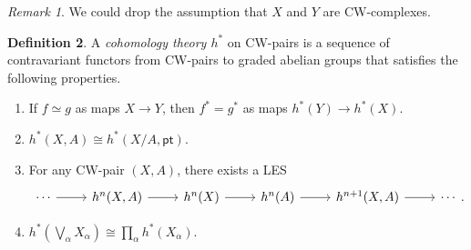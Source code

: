 \documentclass[10pt,letterpaper,cm]{nupset}
\theoremstyle{definition}
\newtheorem{definition}{Definition}[subsection]
\theoremstyle{theorem}
\theoremstyle{remark}
\newtheorem{remark}[definition]{Remark}
\newcommand{\1}{\mathbb{1}}
\newcommand{\0}{\vec 0}
\newcommand{\pt}{\mathsf{pt}}
\begin{document}
\begin{remark}
We could drop the assumption that $X$ and $Y$ are CW-complexes.
\end{remark}

\begin{definition}
A \textit{cohomology theory $h^{\ast}$} on CW-pairs is a sequence of contravariant functors from CW-pairs to graded abelian groups that satisfies the following properties.
\begin{enumerate}[label=(\arabic*)]
\item If $f \simeq g$ as maps $X\to Y$, then $f^{\ast} = g^{\ast}$ as maps $h^{\ast}(Y) \to h^{\ast}(X)$.
\item $h^{\ast}(X, A) \cong h^{\ast}(X/A, \pt)$.
\item For any CW-pair $(X, A)$, there exists a LES
\[
\begin{tikzcd}
\cdots \arrow[r] & h^n(X, A) \arrow[r] & h^n(X) \arrow[r] & h^n(A) \arrow[r] & h^{n+1}(X, A) \arrow[r] & \cdots
\end{tikzcd}.
\]
\item $h^{\ast}\left(\bigvee_{\alpha} X_{\alpha}\right) \cong \prod_{\alpha} h^{\ast}(X_{\alpha})$.
\end{enumerate}
\end{definition}
\end{document}
